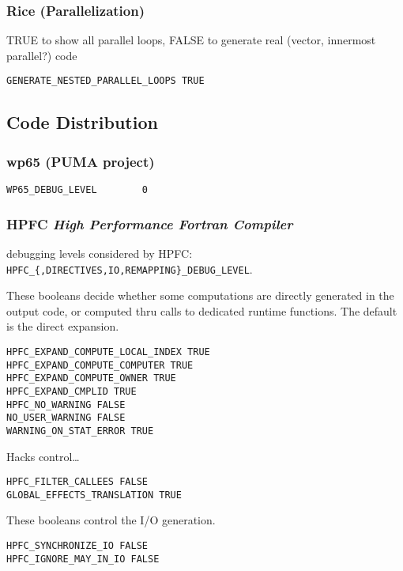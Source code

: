 \subsubsection{Rice (Parallelization)}

TRUE to show all parallel loops, FALSE to generate real (vector,
innermost parallel?) code

\begin{verbatim}
GENERATE_NESTED_PARALLEL_LOOPS TRUE
\end{verbatim}

\subsection{Code Distribution}

\subsubsection{wp65 (PUMA project)}

\begin{verbatim}
WP65_DEBUG_LEVEL        0
\end{verbatim}

\subsubsection{HPFC {\em High Performance Fortran Compiler}}

debugging levels considered by HPFC: 
\verb+HPFC_{,DIRECTIVES,IO,REMAPPING}_DEBUG_LEVEL+.

  These booleans decide whether some computations are directly
generated in the output code, or computed thru calls to dedicated
runtime functions. The default is the direct expansion.

\begin{verbatim}
HPFC_EXPAND_COMPUTE_LOCAL_INDEX TRUE
HPFC_EXPAND_COMPUTE_COMPUTER TRUE
HPFC_EXPAND_COMPUTE_OWNER TRUE
HPFC_EXPAND_CMPLID TRUE
HPFC_NO_WARNING FALSE
NO_USER_WARNING FALSE
WARNING_ON_STAT_ERROR TRUE
\end{verbatim}

   Hacks control\ldots

\begin{verbatim}
HPFC_FILTER_CALLEES FALSE
GLOBAL_EFFECTS_TRANSLATION TRUE
\end{verbatim}

  These booleans control the I/O generation.

\begin{verbatim}
HPFC_SYNCHRONIZE_IO FALSE
HPFC_IGNORE_MAY_IN_IO FALSE
\end{verbatim}

